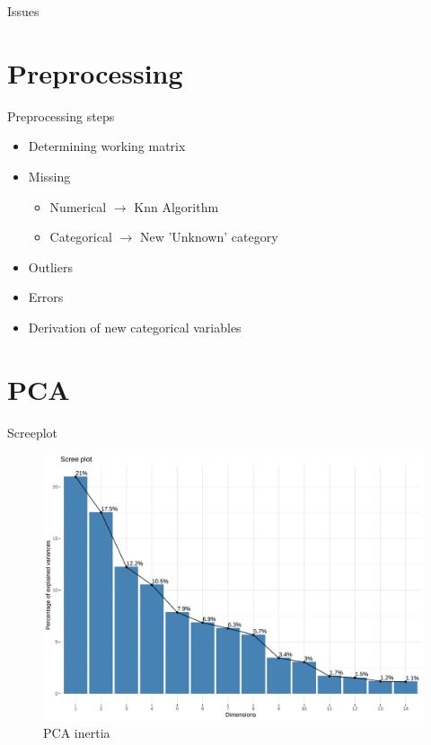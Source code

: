 \begin{frame}{Issues}
\end{frame}

\section{Preprocessing}
\begin{frame}{Preprocessing steps}
\large
\begin{itemize}
     \itemsep0.5em
     \item Determining working matrix
     \item Missing
     \begin{itemize}
         \itemsep0.25em
         \item Numerical $\rightarrow$ Knn Algorithm
         \item Categorical $\rightarrow$ New 'Unknown' category
     \end{itemize}
     \item Outliers
     \item Errors
     \item Derivation of new categorical variables
\end{itemize}
\normalsize
\end{frame}

\section{PCA}
\begin{frame}{Screeplot}
\begin{figure}[H]
    \centering
    \includegraphics[width=0.7\linewidth]{pca_fact-screeplot} %
    \caption{PCA inertia}%
    \label{fig:pca_inertia}
\end{figure}
\end{frame}

